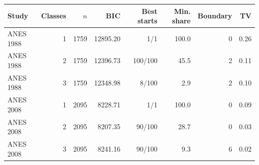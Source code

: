 \begin{tabular}{lrrrrrrr}
\toprule
Study & Classes & $n$ & BIC & Best starts & Min. share & Boundary & TV \\
\midrule
ANES 1988 & 1 & 1759 & 12895.20 & 1/1 & 100.0 & 0 & 0.26 \\
ANES 1988 & 2 & 1759 & 12396.73 & 100/100 & 45.5 & 2 & 0.11 \\
ANES 1988 & 3 & 1759 & 12348.98 & 8/100 & 2.9 & 2 & 0.10 \\
ANES 2008 & 1 & 2095 & 8228.71 & 1/1 & 100.0 & 0 & 0.09 \\
ANES 2008 & 2 & 2095 & 8207.35 & 90/100 & 28.7 & 0 & 0.03 \\
ANES 2008 & 3 & 2095 & 8241.16 & 90/100 & 9.3 & 6 & 0.02 \\
\bottomrule
\end{tabular}
